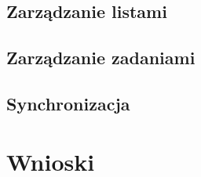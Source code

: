 \documentclass[eng,printmode]{02_class}
\begin{document}
    \section{Zarządzanie listami}
    \label{section:lists}
    

    \section{Zarządzanie zadaniami}
    \label{section:tasks}
    

    \section{Synchronizacja}
    \label{section:sync}
    

  \chapter{Wnioski}
  \label{chapter:conclusions}
  

  \begin{thebibliography}{plain}
    \label{bibliography}
    
  \end{thebibliography}
\end{document}
